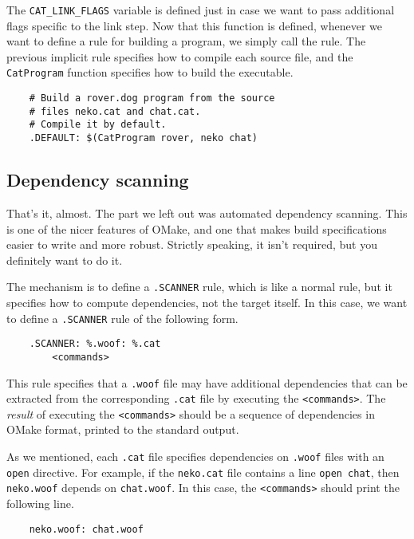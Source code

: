The \verb+CAT_LINK_FLAGS+ variable is defined just in case we want to pass additional flags specific
to the link step.  Now that this function is defined, whenever we want to define a rule for building
a program, we simply call the rule.  The previous implicit rule specifies how to compile each source file,
and the \verb+CatProgram+ function specifies how to build the executable.

\begin{verbatim}
    # Build a rover.dog program from the source
    # files neko.cat and chat.cat.
    # Compile it by default.
    .DEFAULT: $(CatProgram rover, neko chat)
\end{verbatim}

\subsection{Dependency scanning}

That's it, almost.  The part we left out was automated dependency scanning.  This is one of the
nicer features of OMake, and one that makes build specifications easier to write and more robust.
Strictly speaking, it isn't required, but you definitely want to do it.

The mechanism is to define a \verb+.SCANNER+ rule, which is like a normal rule, but it specifies how
to compute dependencies, not the target itself.  In this case, we want to define a \verb+.SCANNER+
rule of the following form.

\begin{verbatim}
    .SCANNER: %.woof: %.cat
        <commands>
\end{verbatim}

This rule specifies that a \verb+.woof+ file may have additional dependencies that can be extracted
from the corresponding \verb+.cat+ file by executing the \verb+<commands>+.  The \emph{result} of
executing the \verb+<commands>+ should be a sequence of dependencies in OMake format, printed to the
standard output.

As we mentioned, each \verb+.cat+ file specifies dependencies on \verb+.woof+ files with an
\verb+open+ directive.  For example, if the \verb+neko.cat+ file contains a line \verb+open chat+,
then \verb+neko.woof+ depends on \verb+chat.woof+.  In this case, the \verb+<commands>+ should print
the following line.

\begin{verbatim}
    neko.woof: chat.woof
\end{verbatim}

